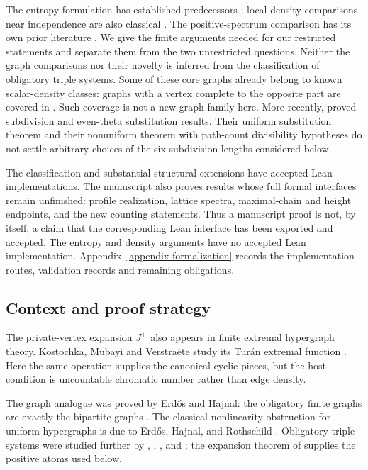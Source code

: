 \documentclass[a4paper,11pt,reqno]{amsart}
\theoremstyle{plain}
\theoremstyle{definition}
\theoremstyle{remark}
\begin{document}
The entropy formulation has established predecessors
\citep{csikvarilin2017,szegedy2015}; local density comparisons near independence
are also classical \citep{lovasz2010}.  The positive-spectrum comparison has
its own prior literature \citep{sidorenko2021}.  We give the finite arguments
needed for our restricted statements and separate them from the two
unrestricted questions.  Neither the graph comparisons nor their novelty
is inferred from the classification of obligatory triple systems.
Some of these core graphs already belong to known scalar-density classes:
graphs with a vertex complete to the opposite part are covered in
\citet{conlonfoxsudakov2012}.  Such coverage is not a new graph family here.
More recently, \citet{imliliu2026} proved subdivision and even-theta
substitution results.  Their uniform substitution theorem and their
nonuniform theorem with path-count divisibility hypotheses do not settle
arbitrary choices of the six subdivision lengths considered below.

The classification and substantial structural extensions have accepted
Lean implementations.  The manuscript also proves results whose full
formal interfaces remain unfinished: profile realization, lattice spectra,
maximal-chain and height endpoints, and the new counting statements.
Thus a manuscript proof is not, by itself, a claim that the corresponding
Lean interface has been exported and accepted.  The entropy and density
arguments have no accepted Lean implementation.
Appendix~\ref{appendix-formalization} records the implementation routes,
validation records and remaining obligations.

\subsection*{Context and proof strategy}

The private-vertex expansion $J^+$ also appears in finite extremal
hypergraph theory.  Kostochka, Mubayi and Verstra{\"e}te study its
Tur{\'a}n extremal function \citep{kostochkamubayiverstraete2015}.
Here the same operation supplies the canonical cyclic pieces, but
the host condition is uncountable chromatic number rather than edge density.

The graph analogue was proved by Erdős and Hajnal: the obligatory finite
graphs are exactly the bipartite graphs
\citep[Corollary~5.6 and Theorem~7.4]{erdoshajnal1966}.  The classical
nonlinearity obstruction for uniform hypergraphs is due to Erdős, Hajnal,
and Rothschild \citep[Theorem~2, p.~532]{ehr1973}.  Obligatory triple
systems were studied further by \citet{egh1975}, \citet{komjath2001},
\citet{hajnalkomjath2008}, and \citet{komjath2008}; the expansion theorem of
\citet[Theorem~1.2]{reiher2024} supplies the positive atoms used below.
\end{document}
